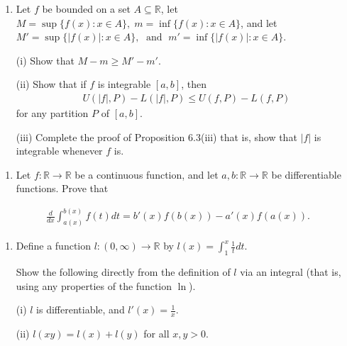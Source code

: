 \documentclass[letterpaper,10pt,english]{jupyterBook}
\begin{document}
\label{\detokenize{Problems:id71}}\begin{enumerate}
%
\setcounter{enumi}{70}
\item {} 
\sphinxAtStartPar
Let \(f\) be bounded on a set \(A\subseteq\mathbb{R}\), let \(M=\sup\{f(x):x\in A\}, \; m=\inf\{f(x):x\in A\}\), and let \(M'=\sup\{|f(x)|:x\in A\}, \; \text{ and } \; m'=\inf\{|f(x)|:x\in A\}\).

\sphinxAtStartPar
(i) Show that \(M-m\geq M'-m'\).

\sphinxAtStartPar
(ii) Show that if \(f\) is integrable \([a,b]\), then
\begin{equation*}
\begin{split}
    U(|f|,P)-L(|f|,P) \leq U(f,P) - L(f,P)
    \end{split}
\end{equation*}
\sphinxAtStartPar
for any partition \(P\) of \([a,b]\).

\sphinxAtStartPar
(iii) Complete the proof of Proposition 6.3(iii) that is, show that \(|f|\) is integrable whenever \(f\) is.

\end{enumerate}
\label{\detokenize{Problems:id72}}\begin{enumerate}
%
\setcounter{enumi}{71}
\item {} 
\sphinxAtStartPar
Let \(f\colon \mathbb{R} \rightarrow \mathbb{R}\) be a continuous function, and let \(a,b\colon \mathbb{R} \rightarrow \mathbb{R}\) be differentiable functions. Prove that

\end{enumerate}
\begin{equation*}
\begin{split}
\frac{d}{dx} \int_{a(x)}^{b(x)} f(t)dt = b'(x)f(b(x))-a'(x)f(a(x)).
\end{split}
\end{equation*}\label{\detokenize{Problems:id73}}\begin{enumerate}
%
\setcounter{enumi}{72}
\item {} 
\sphinxAtStartPar
Define a function \(l:(0,\infty ) \rightarrow \mathbb{R}\) by \(l(x) = \int_1^x \frac{1}{t}dt\).

Show the following directly from the definition of \(l\) via an integral (that is,  using any properties of the function \(\ln\)).

\sphinxAtStartPar
(i) \(l\) is differentiable, and \(l'(x) = \frac{1}{x}\).

\sphinxAtStartPar
(ii) \(l(xy) = l(x)+l(y)\) for all \(x,y >0\).

\end{enumerate}
\end{document}
